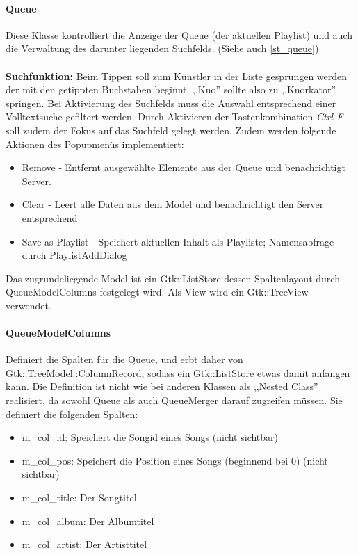 \paragraph{Queue}
Diese Klasse kontrolliert die Anzeige der Queue (der aktuellen Playlist) und auch die Verwaltung des darunter liegenden Suchfelds.
(Siehe auch \ref{st_queue})
\\
\\
\textbf{Suchfunktion:} Beim Tippen soll zum Künstler in der Liste gesprungen werden der mit den getippten Buchstaben beginnt.
,,Kno'' sollte also zu ,,Knorkator'' springen. Bei Aktivierung des Suchfelds muss die Auswahl entsprechend einer Volltextsuche gefiltert werden. Durch Aktivieren der Tastenkombination \textit{Ctrl-F} soll zudem der Fokus auf das Suchfeld gelegt werden.
Zudem werden folgende Aktionen des Popupmenüs implementiert:
\begin{itemize}
\item Remove - Entfernt ausgewählte Elemente aus der Queue und benachrichtigt Server.
\item Clear - Leert alle Daten aus dem Model und benachrichtigt den Server entsprechend
\item Save as Playlist - Speichert aktuellen Inhalt als Playliste; Namensabfrage durch PlaylistAddDialog
\end{itemize}

Das zugrundeliegende Model ist ein Gtk::ListStore dessen Spaltenlayout durch QueueModelColumns festgelegt wird.
Als View wird ein Gtk::TreeView verwendet.

\paragraph{QueueModelColumns}
Definiert die Spalten für die Queue, und erbt daher von Gtk::TreeModel::ColumnRecord, sodass ein Gtk::ListStore etwas damit anfangen kann.
Die Definition ist nicht wie bei anderen Klassen als ,,Nested Class'' realisiert, da sowohl Queue als auch QueueMerger darauf zugreifen müssen. 
Sie definiert die folgenden Spalten:
\begin{itemize}
\item m\_col\_id: Speichert die Songid eines Songs (nicht sichtbar)
\item m\_col\_pos: Speichert die Position eines Songs (beginnend bei 0) (nicht sichtbar)
\item m\_col\_title: Der Songtitel
\item m\_col\_album: Der Albumtitel
\item m\_col\_artist: Der Artisttitel
\end{itemize}

